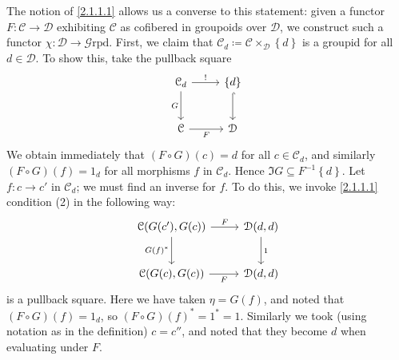 The notion of \cref{2.1.1.1} allows us a converse to this statement: given a functor $F : \mathcal{C}  \to \mathcal{D} $ exhibiting $\mathcal{C} $ as cofibered in groupoids over $\mathcal{D} $, we construct such a functor $\chi : \mathcal{D}  \to \mathcal{G} \mathrm{rpd} $. First, we claim that $\mathcal{C} _d\coloneqq \mathcal{C} \times_\mathcal{D} \left\{ d \right\} $ is a groupid for all $d\in \mathcal{D} $. To show this, take the pullback square
\[\begin{tikzcd}[row sep = 2.5em, column sep = 2.5em]
\mathcal{C} _d \ar[" ! ", r] \ar[" G "', d]  & \left\{ d \right\} \ar[hook, d]  \\
\mathcal{C} \ar[" F "', r]  & \mathcal{D} 
\end{tikzcd}\]
We obtain immediately that $(F\circ G)(c)=d$ for all $c\in \mathcal{C}_d $, and similarly $(F\circ G)(f)=1_d$ for all morphisms $f$ in $\mathcal{C} _d$. Hence $\Im G \subseteq F^{-1} \left\{ d \right\} $. Let $f : c \to c'$ in $\mathcal{C} _d$; we must find an inverse for $f$. To do this, we invoke \cref{2.1.1.1} condition (2) in the following way:
\[\begin{tikzcd}[row sep = 2.5em, column sep = 2.5em]
	\mathcal{C} (G(c'),G(c))\ar[" F ", r] \ar[" G(f)^* "', d]  & \mathcal{D} (d,d)\ar[" 1 ", d]  \\
\mathcal{C} (G(c),G(c))\ar[" F "', r]  & \mathcal{D} (d,d)
\end{tikzcd}\]
is a pullback square. Here we have taken $\eta =G(f)$, and noted that $(F\circ G)(f)=1_d$, so $(F\circ G)(f)^*=1^*=1$. Similarly we took (using notation as in the definition) $c=c''$, and noted that they become $d$ when evaluating under $F$.

